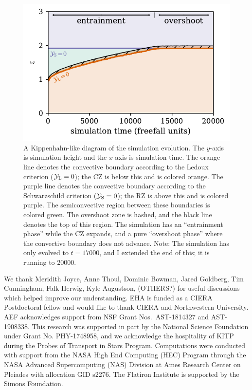 \documentclass[twocolumn, linenumbers, twocolappendix]{aastex631}
\newcommand{\yL}{\ensuremath{\mathcal{Y}_{\rm{L}}}}
\newcommand{\yS}{\ensuremath{\mathcal{Y}_{\rm{S}}}}
\begin{document}


\begin{figure}[t!]
\centering
\includegraphics[width=\columnwidth]{kippenhahn.pdf}
\caption{
    A Kippenhahn-like diagram of the simulation evolution.
    The $y$-axis is simulation height and the $x$-axis is simulation time.
    The orange line denotes the convective boundary according to the Ledoux criterion ($\yL = 0$); the CZ is below this and is colored orange.
    The purple line denotes the convective boundary according to the Schwarzschild criterion ($\yS = 0$); the RZ is above this and is colored purple.
    The semiconvective region between these boundaries is colored green.
    The overshoot zone is hashed, and the black line denotes the top of this region.
    The simulation has an ``entrainment phase'' while the CZ expands, and a pure ``overshoot phase'' where the convective boundary does not advance.
    {\color{blue} Note: The simulation has only evolved to $t = 17000$, and I extended the end of this; it is running to 20000.}
\label{fig:kippenhahn}
}
\end{figure}




\begin{acknowledgments}
We thank Meridith Joyce, Anne Thoul, Dominic Bowman, Jared Goldberg, Tim Cunningham, Falk Herwig, Kyle Augustson, (OTHERS?) for useful discussions which helped improve our understanding.
EHA is funded as a CIERA Postdoctoral fellow and would like to thank CIERA and Northwestern University. 
AEF acknowledges support from NSF Grant Nos.~AST-1814327 and AST-1908338. 
This research was supported in part by the National Science Foundation under Grant No. PHY-1748958, and we acknowledge the hospitality of KITP during the Probes of Transport in Stars Program.
Computations were conducted with support from the NASA High End Computing (HEC) Program through the NASA Advanced Supercomputing (NAS) Division at Ames Research Center on Pleiades with allocation GID s2276.
The Flatiron Institute is supported by the Simons Foundation.
\end{acknowledgments}

\newpage
\appendix





                                                          	



\end{document}
